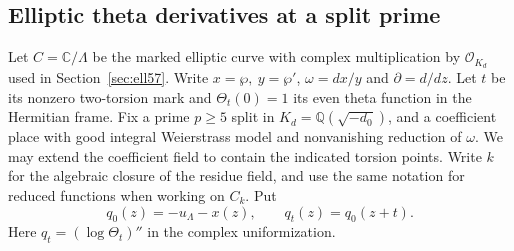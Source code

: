 \documentclass[a4paper,11pt]{article}
\theoremstyle{definition}
\theoremstyle{remark}
\numberwithin{equation}{section}
\begin{document}
\subsection{Elliptic theta derivatives at a split prime}
\label{sec:splitjets480}

Let \(C=\mathbb C/\Lambda\) be the marked elliptic curve with
complex multiplication by \(\mathcal O_{K_d}\) used in
Section~\ref{sec:ell57}. Write \(x=\wp,\ y=\wp'\),
\(\omega=dx/y\) and \(\partial=d/dz\).
Let \(t\) be its nonzero two-torsion mark and \(\Theta_t(0)=1\)
its even theta function in the Hermitian frame. Fix a prime
\(p\ge5\) split in \(K_d=\mathbb Q(\sqrt{-d_0})\), and a
coefficient place with good integral Weierstrass model and
nonvanishing reduction of \(\omega\). We may extend the
coefficient field to contain the indicated torsion points.
Write \(k\) for the algebraic closure of the residue field,
and use the same notation for reduced functions when working
on \(C_k\). Put
\[
 q_0(z)=-u_\Lambda-x(z),\qquad q_t(z)=q_0(z+t).
\]
Here \(q_t=(\log\Theta_t)''\) in the complex uniformization.
\end{document}
